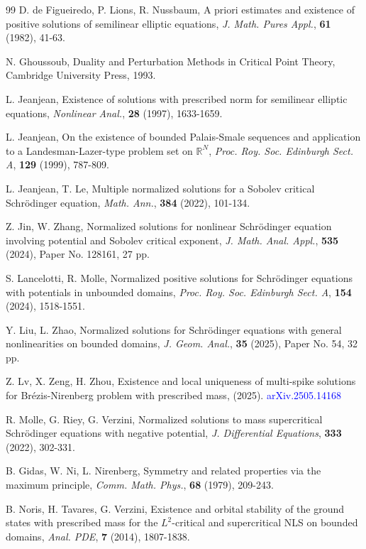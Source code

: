 \documentclass[10pt]{article}
\numberwithin{equation}{section}
\numberwithin{equation}{section}
\begin{document}
\begin{thebibliography}{99}
 D. de Figueiredo, P. Lions, R. Nussbaum, A priori estimates and existence of positive solutions of semilinear elliptic equations, {\it J. Math. Pures Appl.}, {\bf 61} (1982),  41-63.



 N. Ghoussoub, Duality and Perturbation Methods in Critical Point Theory, Cambridge University Press, 1993.

 L. Jeanjean, Existence of solutions with prescribed norm for semilinear elliptic equations, {\it Nonlinear Anal.}, {\bf 28} (1997), 1633-1659.

 L. Jeanjean, On the existence of bounded Palais-Smale sequences and application to a Landesman-Lazer-type problem set on $\mathbb{R}^N$, {\it Proc. Roy. Soc. Edinburgh Sect. A}, {\bf 129} (1999), 787-809.

 L. Jeanjean, T. Le, Multiple normalized solutions for a Sobolev critical Schr\"{o}dinger equation, {\it Math. Ann.}, {\bf 384} (2022), 101-134.

 Z. Jin, W. Zhang,  Normalized solutions for nonlinear Schr\"odinger equation involving potential and Sobolev critical exponent, {\it J. Math. Anal. Appl.}, {\bf 535} (2024),  Paper No. 128161, 27 pp.

 S. Lancelotti, R. Molle, Normalized positive solutions for Schr\"{o}dinger equations with potentials in unbounded domains, {\it Proc. Roy. Soc. Edinburgh Sect. A}, {\bf 154} (2024), 1518-1551.

 Y. Liu, L. Zhao, Normalized solutions for Schr\"{o}dinger equations with general nonlinearities on bounded domains, {\it J. Geom. Anal.}, {\bf 35} (2025), Paper No. 54, 32 pp.

 Z. Lv, X. Zeng, H. Zhou, Existence and local uniqueness of multi-spike solutions for Br\'{e}zis-Nirenberg problem with prescribed mass, (2025). \textcolor{blue}{arXiv.2505.14168}

 R. Molle, G. Riey, G. Verzini,  Normalized solutions to mass supercritical Schr\"{o}dinger equations with negative potential, {\it J. Differential Equations}, {\bf 333} (2022), 302-331.

 B. Gidas, W. Ni, L. Nirenberg, Symmetry and related properties via the maximum principle, {\it Comm. Math. Phys.}, {\bf 68} (1979),  209-243.

 B. Noris, H. Tavares, G. Verzini, Existence and orbital stability of the ground states with prescribed mass for the $L^2$-critical and supercritical NLS on bounded domains, {\it Anal. PDE}, {\bf 7} (2014), 1807-1838.


\end{thebibliography}
\end{document}
